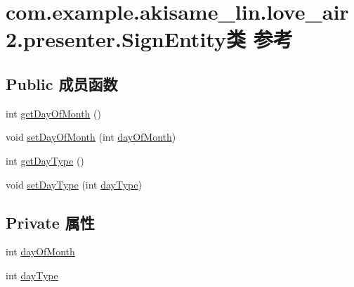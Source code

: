\hypertarget{classcom_1_1example_1_1akisame__lin_1_1love__air2_1_1presenter_1_1_sign_entity}{}\section{com.\+example.\+akisame\+\_\+lin.\+love\+\_\+air2.\+presenter.\+Sign\+Entity类 参考}
\label{classcom_1_1example_1_1akisame__lin_1_1love__air2_1_1presenter_1_1_sign_entity}
\subsection*{Public 成员函数}
\begin{DoxyCompactItemize}
\item 
int \mbox{\hyperlink{classcom_1_1example_1_1akisame__lin_1_1love__air2_1_1presenter_1_1_sign_entity_a7cad223955d947a1ad249b75ff8f4dd2}{get\+Day\+Of\+Month}} ()
\item 
void \mbox{\hyperlink{classcom_1_1example_1_1akisame__lin_1_1love__air2_1_1presenter_1_1_sign_entity_a454643595bec2a987162ff4588e4d899}{set\+Day\+Of\+Month}} (int \mbox{\hyperlink{classcom_1_1example_1_1akisame__lin_1_1love__air2_1_1presenter_1_1_sign_entity_a64a56e8586e23cf2e47d3ab5f727d42f}{day\+Of\+Month}})
\item 
int \mbox{\hyperlink{classcom_1_1example_1_1akisame__lin_1_1love__air2_1_1presenter_1_1_sign_entity_a5ce1735daf68d603fb7cb3310123e4ba}{get\+Day\+Type}} ()
\item 
void \mbox{\hyperlink{classcom_1_1example_1_1akisame__lin_1_1love__air2_1_1presenter_1_1_sign_entity_a439be031eb881de80d029833c6665a33}{set\+Day\+Type}} (int \mbox{\hyperlink{classcom_1_1example_1_1akisame__lin_1_1love__air2_1_1presenter_1_1_sign_entity_a98534aa2d25d47cc051fc8a7f23d367d}{day\+Type}})
\end{DoxyCompactItemize}
\subsection*{Private 属性}
\begin{DoxyCompactItemize}
\item 
int \mbox{\hyperlink{classcom_1_1example_1_1akisame__lin_1_1love__air2_1_1presenter_1_1_sign_entity_a64a56e8586e23cf2e47d3ab5f727d42f}{day\+Of\+Month}}
\item 
int \mbox{\hyperlink{classcom_1_1example_1_1akisame__lin_1_1love__air2_1_1presenter_1_1_sign_entity_a98534aa2d25d47cc051fc8a7f23d367d}{day\+Type}}
\end{DoxyCompactItemize}


